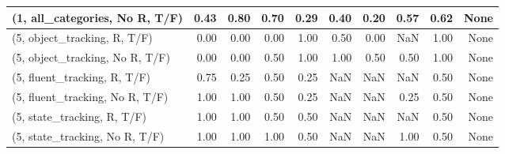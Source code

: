 \begin{table*}[h!]
\begin{adjustbox}{width=2\columnwidth,center}
\begin{tabular}{lrrr|rrr|rrr}
(1, all\_categories, No R, T/F)       &                      0.43 &                  0.80 &                      0.70 &                          0.29 &                      0.40 &                          0.20 &                                   0.57 &                               0.62 &                                  None \\



\midrule
(5, object\_tracking, R, T/F)         &                      0.00 &                  0.00 &                      0.00 &                          1.00 &                      0.50 &                          0.00 &                                    NaN &                               1.00 &                                  None \\
(5, object\_tracking, No R, T/F)      &                      0.00 &                  0.00 &                      0.50 &                          1.00 &                      1.00 &                          0.50 &                                   0.50 &                               1.00 &                                  None \\
(5, fluent\_tracking, R, T/F)         &                      0.75 &                  0.25 &                      0.50 &                          0.25 &                       NaN &                           NaN &                                    NaN &                               0.50 &                                  None \\
(5, fluent\_tracking, No R, T/F)      &                      1.00 &                  1.00 &                      0.50 &                          0.25 &                       NaN &                           NaN &                                   0.25 &                               0.50 &                                  None \\
(5, state\_tracking, R, T/F)          &                      1.00 &                  1.00 &                      0.50 &                          0.50 &                       NaN &                           NaN &                                    NaN &                               0.50 &                                  None \\
(5, state\_tracking, No R, T/F)       &                      1.00 &                  1.00 &                      1.00 &                          0.50 &                       NaN &                           NaN &                                   1.00 &                               0.50 &                                  None \\

\end{tabular}
\end{adjustbox}
\end{table*}
